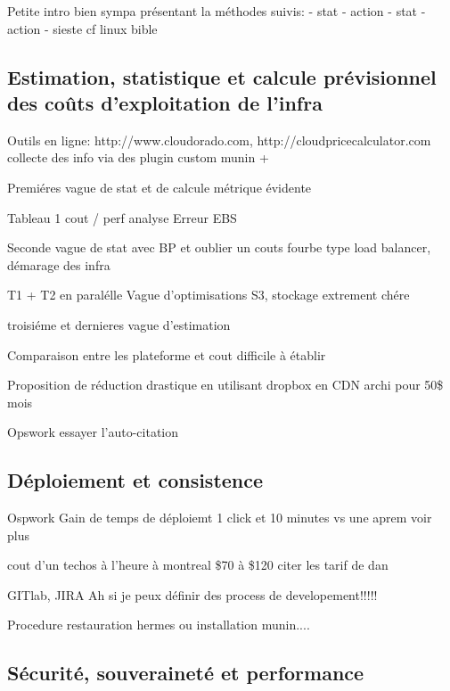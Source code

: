 \documentclass[11pt, a4paper ]{article}
\begin{document}
\begin{spacing}{1.5}
		Petite intro bien sympa présentant la méthodes suivis:
			- stat
			- action
			- stat
			- action
			- sieste
			cf linux bible

	\subsection{Estimation, statistique et calcule prévisionnel des coûts d'exploitation de l'infra} %


Outils en ligne: http://www.cloudorado.com, http://cloudpricecalculator.com
collecte des info via des plugin custom munin +

Premiéres vague de stat et de calcule métrique évidente

Tableau 1 cout / perf
analyse
Erreur EBS

Seconde vague de stat avec BP et oublier un couts fourbe type load balancer, démarage des infra

T1 + T2 en paralélle
Vague d'optimisations S3, stockage extrement chére

troisiéme et dernieres vague d'estimation

Comparaison entre les plateforme et cout difficile à établir

Proposition de réduction drastique en utilisant dropbox en CDN archi pour 50\$ mois

Opswork essayer l'auto-citation


\subsection{Déploiement et consistence}

Ospwork Gain de temps de déploiemt 1 click et 10 minutes vs une aprem voir plus

cout d'un techos à l'heure à montreal \$70 à \$120 citer les tarif de dan

GITlab, JIRA Ah si je peux définir des process de developement!!!!!


Procedure restauration hermes ou installation munin.... %

	\subsection{Sécurité, souveraineté et performance}


\end{spacing}
\end{document}
